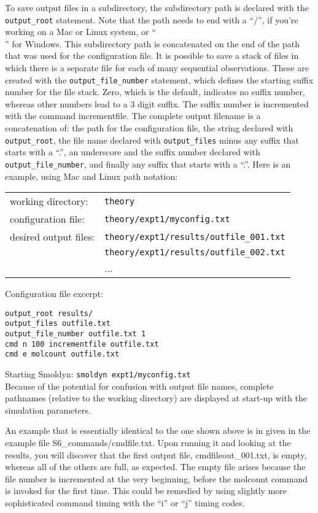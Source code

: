 \documentclass {scrbook}
\newcommand {\ttt} {\texttt}
\begin{document}
To save output files in a subdirectory, the subdirectory path is declared with the \ttt{output\_root} statement. Note that the path needs to end with a ``/'', if you're working on a Mac or Linux system, or ``\\'' for Windows. This subdirectory path is concatenated on the end of the path that was used for the configuration file. It is possible to save a stack of files in which there is a separate file for each of many sequential observations. These are created with the \ttt{output\_file\_number} statement, which defines the starting suffix number for the file stack. Zero, which is the default, indicates no suffix number, whereas other numbers lead to a 3 digit suffix. The suffix number is incremented with the command incrementfile. The complete output filename is a concatenation of: the path for the configuration file, the string declared with \ttt{output\_root}, the file name declared with \ttt{output\_files} minus any suffix that starts with a ``.'', an underscore and the suffix number declared with \ttt{output\_file\_number}, and finally any suffix that starts with a ``.''. Here is an example, using Mac and Linux path notation:

\begin{longtable}[c]{ll}
working directory: & \ttt{theory}\\
configuration file: & \ttt{theory/expt1/myconfig.txt}\\
desired output files: & \ttt{theory/expt1/results/outfile\_001.txt}\\
 & \ttt{theory/expt1/results/outfile\_002.txt}\\
 & ...
\end{longtable}

Configuration file excerpt:
\begin{lstlisting}[style=SSAC]
output_root results/
output_files outfile.txt
output_file_number outfile.txt 1
cmd n 100 incrementfile outfile.txt
cmd e molcount outfile.txt
\end{lstlisting}
Starting Smoldyn: \ttt{smoldyn expt1/myconfig.txt}\\

Because of the potential for confusion with output file names, complete pathnames (relative to the working directory) are displayed at start-up with the simulation parameters.

An example that is essentially identical to the one shown above is in given in the example file S6\_commands/cmdfile.txt. Upon running it and looking at the results, you will discover that the first output file, cmdfileout\_001.txt, is empty, whereas all of the others are full, as expected. The empty file arises because the file number is incremented at the very beginning, before the molcount command is invoked for the first time. This could be remedied by using slightly more sophisticated command timing with the ``i'' or ``j'' timing codes.
\end{document}
